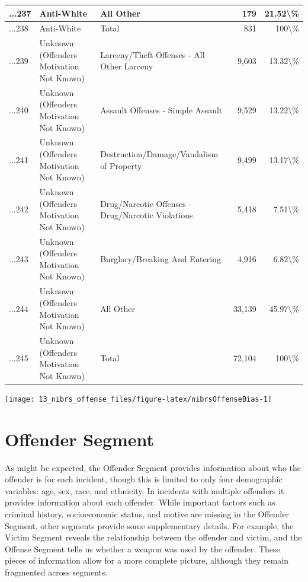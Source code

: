 \documentclass[
]{krantz}
\let\origfigure\figure
\let\endorigfigure\endfigure
\renewenvironment{figure}[1][2] {
    \expandafter\origfigure\expandafter[H]
} {
    \endorigfigure
}
\begin{document}
\begin{longtable}[t]{l|l|l|r|r}
...237 & Anti-White & All Other & 179 & 21.52\textbackslash{}\%\\
\hline
...238 & Anti-White & Total & 831 & 100\textbackslash{}\%\\
\hline
...239 & Unknown (Offenders Motivation Not Known) & Larceny/Theft Offenses - All Other Larceny & 9,603 & 13.32\textbackslash{}\%\\
\hline
...240 & Unknown (Offenders Motivation Not Known) & Assault Offenses - Simple Assault & 9,529 & 13.22\textbackslash{}\%\\
\hline
...241 & Unknown (Offenders Motivation Not Known) & Destruction/Damage/Vandalism of Property & 9,499 & 13.17\textbackslash{}\%\\
\hline
...242 & Unknown (Offenders Motivation Not Known) & Drug/Narcotic Offenses - Drug/Narcotic Violations & 5,418 & 7.51\textbackslash{}\%\\
\hline
...243 & Unknown (Offenders Motivation Not Known) & Burglary/Breaking And Entering & 4,916 & 6.82\textbackslash{}\%\\
\hline
...244 & Unknown (Offenders Motivation Not Known) & All Other & 33,139 & 45.97\textbackslash{}\%\\
\hline
...245 & Unknown (Offenders Motivation Not Known) & Total & 72,104 & 100\textbackslash{}\%\\
\hline
\end{longtable}

\begin{figure}

{\centering \texttt{[image: 13\_nibrs\_offense\_files/figure-latex/nibrsOffenseBias-1]} 

}

\caption{The annual percent of offenses reported as having a bias motivation (i.e. hate crime), 1993-2023.}\label{fig:nibrsOffenseBias}
\end{figure}

\chapter{Offender Segment}\label{offender-segment-1}

As might be expected, the Offender Segment provides
information about who the offender is for each incident,
though this is limited to only four demographic variables:
age, sex, race, and ethnicity. In incidents with multiple
offenders it provides information about each offender. While
important factors such as criminal history, socioeconomic
status, and motive are missing in the Offender Segment,
other segments provide some supplementary details. For
example, the Victim Segment reveals the relationship between
the offender and victim, and the Offense Segment tells us
whether a weapon was used by the offender. These pieces of
information allow for a more complete picture, although they
remain fragmented across segments.
\end{document}
